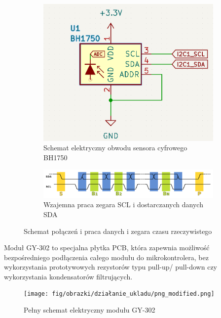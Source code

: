 \documentclass[11pt, a4paper]{article}
\begin{document}
\vspace{0.5cm}
\begin{figure}[h]
\centering
\begin{subfigure}{.5\textwidth}
  \centering
  \includegraphics[width=.78\linewidth]{fig/obrazki/zasada_dzialania/BH.png}  
  \caption{Schemat elektryczny obwodu sensora cyfrowego BH1750}
  \label{fig:sub1}
\end{subfigure}%
\begin{subfigure}{.5\textwidth}
  \centering
  \includegraphics[width=.98\linewidth]{fig/obrazki/zasada_dzialania/I2C.png}
  \caption{Wzajemna praca zegara SCL i dostarczanych danych SDA}
  \label{fig:sub2}
\end{subfigure}
\caption{Schemat połączeń i praca danych i zegara czasu rzeczywistego}
\label{fig:test}
\end{figure}
\vspace{0.5cm}


Moduł GY-302 to specjalna płytka PCB, która zapewnia możliwość bezpośredniego podłączenia całego modułu do mikrokontrolera, bez wykorzystania prototywowych rezystorów typu pull-up/ pull-down czy wykorzystania kondensatorów filtrujących.


\begin{figure}[h!]
    \centering
    \texttt{[image: fig/obrazki/działanie\_ukladu/png\_modified.png]}
    \caption{Pełny schemat elektryczny modułu GY-302}
    \label{fig:my_label}
\end{figure}
\end{document}
